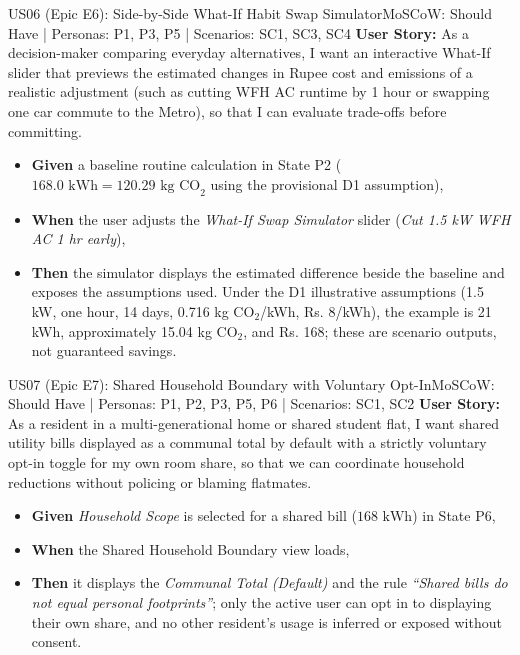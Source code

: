 \documentclass[12pt, a4paper]{article}
\begin{document}
\begin{storybox}{US06 (Epic E6): Side-by-Side What-If Habit Swap Simulator}{MoSCoW: Should Have | Personas: P1, P3, P5 | Scenarios: SC1, SC3, SC4}
\textbf{User Story:} As a decision-maker comparing everyday alternatives, I want an interactive What-If slider that previews the estimated changes in Rupee cost and emissions of a realistic adjustment (such as cutting WFH AC runtime by 1 hour or swapping one car commute to the Metro), so that I can evaluate trade-offs before committing.
\begin{itemize}
    \item \textbf{Given} a baseline routine calculation in State P2 ($168.0\text{ kWh} = 120.29\text{ kg CO}_2$ using the provisional D1 assumption),
    \item \textbf{When} the user adjusts the \textit{What-If Swap Simulator} slider (\textit{Cut 1.5 kW WFH AC 1 hr early}),
    \item \textbf{Then} the simulator displays the estimated difference beside the baseline and exposes the assumptions used. Under the D1 illustrative assumptions (1.5 kW, one hour, 14 days, 0.716 kg CO$_2$/kWh, Rs. 8/kWh), the example is 21 kWh, approximately 15.04 kg CO$_2$, and Rs. 168; these are scenario outputs, not guaranteed savings.
\end{itemize}
\end{storybox}

\begin{storybox}{US07 (Epic E7): Shared Household Boundary with Voluntary Opt-In}{MoSCoW: Should Have | Personas: P1, P2, P3, P5, P6 | Scenarios: SC1, SC2}
\textbf{User Story:} As a resident in a multi-generational home or shared student flat, I want shared utility bills displayed as a communal total by default with a strictly voluntary opt-in toggle for my own room share, so that we can coordinate household reductions without policing or blaming flatmates.
\begin{itemize}
    \item \textbf{Given} \textit{Household Scope} is selected for a shared bill ($168\text{ kWh}$) in State P6,
    \item \textbf{When} the Shared Household Boundary view loads,
    \item \textbf{Then} it displays the \textit{Communal Total (Default)} and the rule \textit{``Shared bills do not equal personal footprints''}; only the active user can opt in to displaying their own share, and no other resident's usage is inferred or exposed without consent.
\end{itemize}
\end{storybox}
\end{document}
